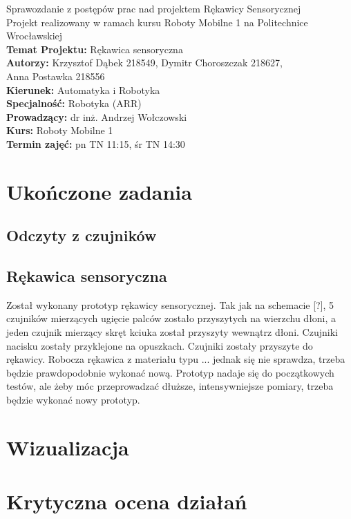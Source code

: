 \documentclass[12pt,a4paper]{article}
\begin{document}
\LARGE\centering Sprawozdanie z postępów prac nad projektem Rękawicy Sensorycznej\\
\large\centering Projekt realizowany w ramach kursu Roboty Mobilne 1 na Politechnice Wrocławskiej\\
\vspace{5 mm}
\normalsize\flushleft\textbf{Temat Projektu:} Rękawica sensoryczna\\
\textbf{Autorzy:} Krzysztof Dąbek 218549, Dymitr Choroszczak 218627,\\Anna Postawka 218556\\
\textbf{Kierunek:} Automatyka i Robotyka\\
\textbf{Specjalność:} Robotyka (ARR)\\
\textbf{Prowadzący:} dr inż. Andrzej Wołczowski\\
\textbf{Kurs:} Roboty Mobilne 1\\
\textbf{Termin zajęć:} pn TN 11:15, śr TN 14:30\\
\vspace{5 mm}
\section{Ukończone zadania}
\subsection{Odczyty z czujników}

\subsection{Rękawica sensoryczna}
Został wykonany prototyp rękawicy sensorycznej. 
Tak jak na schemacie [?], 5 czujników mierzących ugięcie palców zostało przyszytych na wierzchu dłoni, a jeden czujnik mierzący skręt kciuka został przyszyty wewnątrz dłoni. Czujniki nacisku zostały przyklejone na opuszkach. 
Czujniki zostały przyszyte do rękawicy.
Robocza rękawica z materiału typu ... jednak się nie sprawdza, trzeba będzie prawdopodobnie wykonać nową.
Prototyp nadaje się do początkowych testów, ale żeby móc przeprowadzać dłuższe, intensywniejsze pomiary, trzeba będzie wykonać nowy prototyp.
\section{Wizualizacja}

\section{Krytyczna ocena działań}
\end{document}
